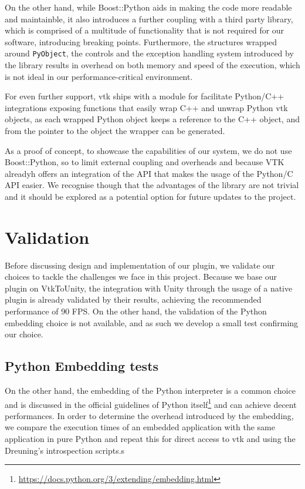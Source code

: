 On the other hand, while Boost::Python aids in making the code more readable and maintainble, it also introduces a further coupling with a third party library, which is comprised of a multitude of functionality that is not required for our software, introducing breaking points. Furthermore, the structures wrapped around \verb|PyObject|, the controls and the exception handling system introduced by the library results in overhead on both memory and speed of the execution, which is not ideal in our performance-critical environment. 

For even further support, \acrshort{vtk} ships with a module for facilitate Python/C++ integrations exposing functions that easily wrap C++ and unwrap Python \acrshort{vtk} objects, as each wrapped Python object keeps a reference to the C++ object, and from the pointer to the object the wrapper can be generated.

As a proof of concept, to showcase the capabilities of our system, we do not use Boost::Python, so to limit external coupling and overheads and because VTK alreadyh offers an integration of the API that makes the usage of the Python/C API easier. We recognise though that the advantages of the library are not trivial and it should be explored as a potential option for future updates to the project.

\section{Validation}
\label{sec:rqrmsandclngs-validation}

Before discussing design and implementation of our plugin, we validate our choices to tackle the challenges we face in this project. Because we base our plugin on VtkToUnity, the integration with Unity through the usage of a native plugin is already validated by their results, achieving the recommended performance of 90 FPS. On the other hand, the validation of the Python embedding choice is not available, and as such we develop a small test confirming our choice.

\subsection{Python Embedding tests}

On the other hand, the embedding of the Python interpreter is a common choice and is discussed in the official guidelines of Python itself\footnote{\url{https://docs.python.org/3/extending/embedding.html}} and can achieve decent performances. In order to determine the overhead introduced by the embedding, we compare the execution times of an embedded application with the same application in pure Python and repeat this for direct access to \acrshort{vtk} and using the Dreuning's introspection scripts.s

